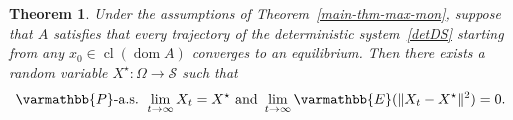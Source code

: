 \documentclass[11pt,reqno]{article}
\let\mathbb=\varmathbb
\newcommand{\R}{\mathbb{R}}
\newcommand{\1}{\mathds{1}}
\numberwithin{equation}{section}  %
\theoremstyle{plain}
\newtheorem{theorem}{Theorem}
\theoremstyle{definition}
\theoremstyle{remark}
\numberwithin{theorem}{section}
\numberwithin{remark}{section}
\numberwithin{example}{section}
\begin{document}

\begin{theorem}\label{general_convergence_SDI}
   Under the assumptions of Theorem~\ref{main-thm-max-mon}, suppose that $A$ satisfies that every trajectory of the deterministic system~\eqref{detDS} starting from any $x_0 \in \operatorname{cl}(\operatorname{dom} A)$ converges to an equilibrium. Then there exists a random variable $X^\star \colon \Omega \to \mathcal{S}$ such that 
\begin{equation*}
        \mathbb{P}\text{-a.s. } \lim_{t\to \infty}X_t = X^\star \text{ and } \lim_{t\to \infty}\mathbb{E}(\|X_t-X^\star\|^2) = 0.
    \end{equation*}
\end{theorem}
\end{document}
